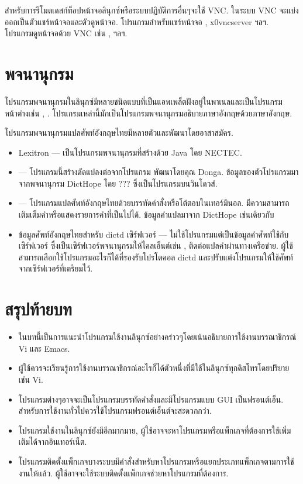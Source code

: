 \begin{thwbr}
สำหรับการรีโมตเดสก์ท็อปหน้าจอลินุกซ์หรือระบบปฏิบัติการอื่นๆจะใช้ VNC. ในระบบ VNC จะแบ่งออกเป็นตัวแชร์หน้าจอและตัวดูหน้าจอ. โปรแกรมสำหรับแชร์หน้าจอ , x0vncserver ฯลฯ.   โปรแกรมดูหน้าจอด้วย VNC เช่น ,  ฯลฯ.

\section{พจนานุกรม}
โปรแกรมพจนานุกรมในลินุกซ์มีหลายชนิดแบบที่เป็นแอพเพล็ตฝังอยู่ในพาเนลและเป็นโปรแกรมหน้าต่างเช่น , . โปรแกรมเหล่านี้มักเป็นโปรแกรมพจนานุกรมอธิบายภาษาอังกฤษด้วยภาษาอังกฤษ. 

โปรแกรมพจนานุกรมแปลศัพท์อังกฤษไทยมีหลายตัวและพัฒนาโดยอาสาสมัคร. 
\begin{itemize}
\item Lexitron --- เป็นโปรแกรมพจนานุกรมที่สร้างด้วย Java โดย NECTEC.
\item {} --- โปรแกรมนี้สร้างดัดแปลงต่อจากโปรแกรม  พัฒนาโดยคุณ Donga. ข้อมูลของตัวโปรแกรมมาจากพจนานุกรม DictHope โดย ??? ซึ่งเป็นโปรแกรมบนวินโดวส์.

\begin{figure}[!hbt]
\end{figure}

\item {} --- โปรแกรมแปลศัพท์อังกฤษไทยด้วยบรรทัดคำสั่งหรือโต้ตอบในเทอร์มินอล. มีความสามารถเติมเต็มคำหรือแสดงรายการคำที่เป็นไปได้. ข้อมูลคำแปลมาจาก DictHope เช่นเดียวกับ 
\item ข้อมูลศัพท์อังกฤษไทยสำหรับ dictd เซิร์ฟเวอร์ --- ไม่ใช้โปรแกรมแต่เป็นข้อมูลคำศัพท์ใช้กับเซิร์ฟเวอร์  ซึ่งเป็นเซิร์ฟเวอร์พจนานุกรมให้ไคลเอ็นต์เช่น ,  ติดต่อแปลคำผ่านทางเครือข่าย. ผู้ใช้สามารถเลือกใช้โปรแกรมอะไรก็ได้ที่รองรับโปรโตคอล dictd และปรับแต่งโปรแกรมให้ใช้ศัพท์จากเซิร์ฟเวอร์ที่เตรียมไว้.
\end{itemize}


\section{สรุปท้ายบท}
\begin{itemize}
\item ในบทนี้เป็นการแนะนำโปรแกรมใช้งานลินุกซ์อย่างคร่าวๆโดยเน้นอธิบายการใช้งานบรรณาธิกรณ์ Vi และ Emacs. 
\item ผู้ใช้ควรจะเรียนรู้การใช้งานบรรณาธิกรณ์อะไรก็ได้ตัวหนึ่งที่มีใช้ในลินุกซ์ทุกดิสโทรโดยปริยายเช่น Vi.
\item โปรแกรมต่างๆอาจจะเป็นโปรแกรมบรรทัดคำสั่งและมีโปรแกรมแบบ GUI เป็นฟรอนต์เอ็น. สำหรับการใช้งานทั่วไปควรใช้โปรแกรมฟรอนต์เอ็นต์จะสะดวกกว่า.
\item โปรแกรมใช้งานในลินุกซ์ยังมีอีกมากมาย, ผู้ใช้อาจจะหาโปรแกรมหรือแพ็กเกจที่ต้องการใช้เพิ่มเติมได้จากอินเทอร์เน็ต. 
\item โปรแกรมติดตั้งแพ็กเกจบางระบบมีคำสั่งสำหรับหาโปรแกรมหรือแยกประเภทแพ็กเกจตามการใช้งานให้แล้ว. ผู้ใช้อาจจะใช้ระบบติดตั้งแพ็กเกจช่วยหาโปรแกรมที่ต้องการ.
\end{itemize}


\end{thwbr}
\wbrin
